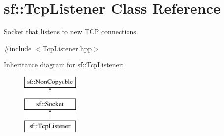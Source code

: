 \hypertarget{classsf_1_1_tcp_listener}{}\section{sf\+:\+:Tcp\+Listener Class Reference}
\label{classsf_1_1_tcp_listener}


\mbox{\hyperlink{classsf_1_1_socket}{Socket}} that listens to new T\+CP connections.  




{\ttfamily \#include $<$Tcp\+Listener.\+hpp$>$}

Inheritance diagram for sf\+:\+:Tcp\+Listener\+:\begin{figure}[H]
\begin{center}
\leavevmode
\includegraphics[height=3.000000cm]{classsf_1_1_tcp_listener}
\end{center}
\end{figure}
